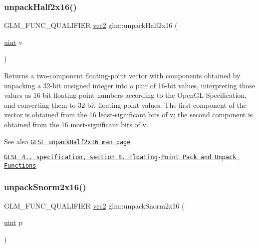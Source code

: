 \subsubsection{\texorpdfstring{unpack\+Half2x16()}{unpackHalf2x16()}}
{\footnotesize\ttfamily G\+L\+M\+\_\+\+F\+U\+N\+C\+\_\+\+Q\+U\+A\+L\+I\+F\+I\+ER \hyperlink{group__core__types_gaa1618f51db67eaa145db101d8c8431d8}{vec2} glm\+::unpack\+Half2x16 (\begin{DoxyParamCaption}\item[{\hyperlink{group__core__precision_ga4fd29415871152bfb5abd588334147c8}{uint}}]{v }\end{DoxyParamCaption})}

Returns a two-\/component floating-\/point vector with components obtained by unpacking a 32-\/bit unsigned integer into a pair of 16-\/bit values, interpreting those values as 16-\/bit floating-\/point numbers according to the Open\+GL Specification, and converting them to 32-\/bit floating-\/point values. The first component of the vector is obtained from the 16 least-\/significant bits of v; the second component is obtained from the 16 most-\/significant bits of v.

\begin{DoxySeeAlso}{See also}
\href{http://www.opengl.org/sdk/docs/manglsl/xhtml/unpackHalf2x16.xml}{\tt G\+L\+SL unpack\+Half2x16 man page} 

\href{http://www.opengl.org/registry/doc/GLSLangSpec.4.20.8.pdf}{\tt G\+L\+SL 4.. specification, section 8. Floating-\/\+Point Pack and Unpack Functions} 
\end{DoxySeeAlso}
\mbox{\label{group__core__func__packing_gae5f30f599243df9525315edecae09a7f}} 
\subsubsection{\texorpdfstring{unpack\+Snorm2x16()}{unpackSnorm2x16()}}
{\footnotesize\ttfamily G\+L\+M\+\_\+\+F\+U\+N\+C\+\_\+\+Q\+U\+A\+L\+I\+F\+I\+ER \hyperlink{group__core__types_gaa1618f51db67eaa145db101d8c8431d8}{vec2} glm\+::unpack\+Snorm2x16 (\begin{DoxyParamCaption}\item[{\hyperlink{group__core__precision_ga4fd29415871152bfb5abd588334147c8}{uint}}]{p }\end{DoxyParamCaption})}

